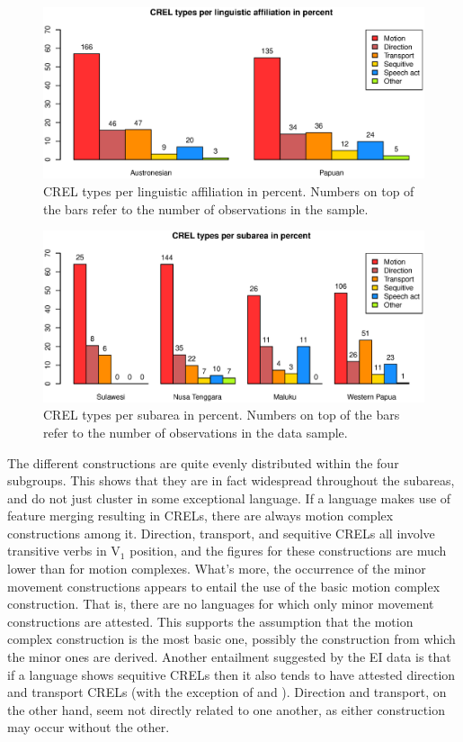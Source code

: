 \begin{figure}[b]
\includegraphics[width=\columnwidth]{figures/CREL_Family.eps}
\caption[CREL types per linguistic affiliation in percent]{CREL types per linguistic affiliation in percent. Numbers on top of the bars refer to the number of observations in the sample.}\label{fig:crel-family}
\end{figure}
\begin{figure}[t]
\includegraphics[width=\columnwidth]{figures/CREL_Group.eps}
\caption[CREL types per subarea in percent]{CREL types per subarea in percent. Numbers on top of the bars refer to the number of observations in the data sample.}\label{fig:crel-group}
\end{figure}


The different constructions are quite evenly distributed within the four subgroups. This shows that they are in fact widespread throughout the subareas, and do not just cluster in some exceptional language. If a language makes use of feature merging resulting in CRELs, there are always motion complex constructions among it. Direction, transport, and sequitive CRELs all involve transitive verbs in V$_1$ position, and the figures for these constructions are much lower than for motion complexes. What's more, the occurrence of the minor movement constructions appears to entail the use of the basic motion complex construction. That is, there are no languages for which only minor movement constructions are attested. This supports the assumption that the motion complex construction is the most basic one, possibly the construction from which the minor ones are derived. Another entailment suggested by the EI data is that if a language shows sequitive CRELs then it also tends to have attested direction and transport CRELs (with the exception of  and ). Direction and transport, on the other hand, seem not directly related to one another, as either construction may occur without the other.

